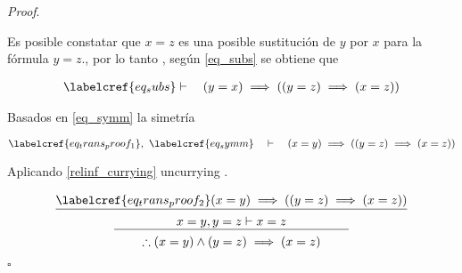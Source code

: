 \textit{Proof}. 

Es posible constatar que $x = z$ es una  posible sustitución de $y$ por $x$ para la fórmula $y = z$., por lo tanto , según \cref{eq_subs} se obtiene que

\begin{equation} \label{eq_trans_proof_1}
	\begin{gathered}
		\labelcref{eq_subs} \vdash \quad (y = x) \implies ((y = z) \implies (x=z))
	\end{gathered}
\end{equation}

Basados en \cref{eq_symm}  la simetría 

\begin{equation} \label{eq_trans_proof_2}
	\labelcref{eq_trans_proof_1},\ \labelcref{eq_symm} \quad \vdash \quad (x = y) \implies ((y = z) \implies (x=z))
\end{equation}

Aplicando \cref{relinf_currying} uncurrying .

\begin{equation} 
\begin{gathered}
	\underline{\labelcref{eq_trans_proof_2} (x = y) \implies ((y = z) \implies (x=z))} \\
	\underline{\quad \quad \quad \quad\quad x = y, y=z \vdash x=z \quad \quad \quad \quad \quad} \\
	\therefore (x = y) \land (y=z) \implies (x=z)
\end{gathered}
\end{equation}

\hfill $\square$